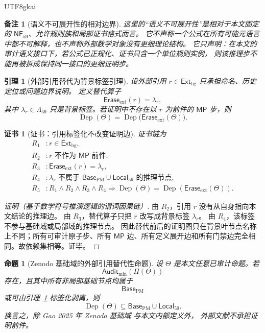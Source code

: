 \documentclass[12pt]{article}
\newtheorem{proposition}{命题}[section]
\newtheorem{lemma}{引理}[section]
\newtheorem{remark}{备注}[section]
\newtheorem{Certificate}{证书}[section]
\DeclareMathOperator{\Dep}{Dep}
\begin{document}
\begin{CJK*}{UTF8}{gkai}
\begin{remark}[语义不可展开性的相对边界]
这里的“语义不可展开性”是相对于本文固定的 \(\mathsf{NF}_{59}\)、允许规则族和局部证书格式而言。
它不声称一个公式在所有可能元语言中都不可解释，也不声称外部数学对象没有更细理论结构。
它只声明：在本文的审计语义接口下，若公式已正规化、证书只含一个单位规则实例，
则该推理步不能再被拆成保持同一接口的更细证明步。
\end{remark}

\begin{lemma}[外部引用替代为背景标签引理]
\label{lem:tex59-external-reference-replacement}
设外部引用 \(r\in\mathsf{Ext}_{\mathrm{bg}}\) 只承担命名、历史定位或问题边界说明。
定义替代算子
\[
  \mathsf{Erase}_{\mathrm{ext}}(r)=\lambda_r,
\]
其中 \(\lambda_r\in\Lambda_{59}\) 只是背景标签。若证明中不存在以 \(r\) 为前件的
\(\mathsf{MP}\) 步，则
\[
  \Dep(\Theta)
  =
  \Dep\bigl(\mathsf{Erase}_{\mathrm{ext}}(\Theta)\bigr).
\]
\end{lemma}

\begin{Certificate}[证书：引用标签化不改变证明边]
\label{cert:tex59-external-reference-replacement}
证书链为
\[
\begin{aligned}
  R_1 &: r\in\mathsf{Ext}_{\mathrm{bg}},\\
  R_2 &: r\text{ 不作为 }\mathsf{MP}\text{ 前件},\\
  R_3 &: \mathsf{Erase}_{\mathrm{ext}}(r)=\lambda_r,\\
  R_4 &: \lambda_r\text{ 不属于 }\mathsf{Base}_{\mathrm{PM}}\cup\mathsf{Local}_{59}\text{ 的推理节点},\\
  R_5 &: R_1\wedge R_2\wedge R_3\wedge R_4
        \Rightarrow
        \Dep(\Theta)=\Dep(\mathsf{Erase}_{\mathrm{ext}}(\Theta)).
\end{aligned}
\]
\end{Certificate}

\begin{proof}[证明（基于数学符号推演逻辑的谓词因果链）]
由 \(R_2\)，引用 \(r\) 没有从自身指向本文结论的推理边。
由 \(R_3\)，替代算子只把 \(r\) 改写成背景标签 \(\lambda_r\)。
由 \(R_4\)，该标签不参与基础域或局部域的推理节点。
因此替代前后的证明图只在背景叶节点名称上不同；所有可审计原子步、所有
\(\mathsf{MP}\) 边、所有定义展开边和所有门禁边完全相同。故依赖集相等。证毕。
\end{proof}

\begin{proposition}[Zenodo 基础域的外部引用替代性命题]
\label{prop:tex59-gao-base-substitution}
设 \(\Theta\) 是本文任意已审计命题。若
\[
  \mathsf{Audit}_{\min}(\Pi(\Theta))
\]
存在，且其中所有非局部基础节点均属于
\[
  \mathsf{Base}_{\mathrm{PM}}
\]
或可由引理~\ref{lem:tex59-external-reference-replacement} 标签化剥离，则
\[
  \Dep(\Theta)
  \subseteq
  \mathsf{Base}_{\mathrm{PM}}\cup\mathsf{Local}_{59}.
\]
换言之，除 Gao 2025 年 Zenodo 基础域 \cite{Gao2025PureMathZenodo} 与本文内部定义外，
外部文献不承担证明前件。
\end{proposition}


\end{CJK*}
\end{document}
